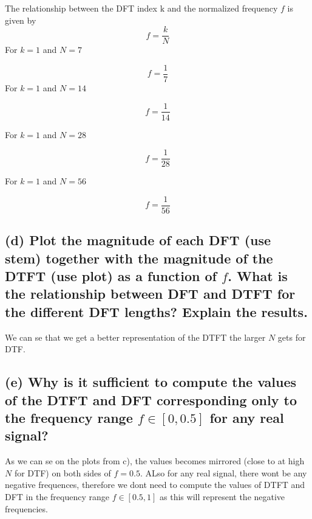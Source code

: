 The relationship between the DFT index $\mathrm{k}$ and the normalized frequency $f$ is given by
$$f=\frac{k}{N}$$
For $k=1$ and $N=7$

$$f=\frac{1}{7}$$
For $k=1$ and $N=14$

$$f=\frac{1}{14}$$

For $k=1$ and $N=28$

$$f=\frac{1}{28}$$

For $k=1$ and $N=56$

$$f=\frac{1}{56}$$


\subsection*{(d) Plot the magnitude of each DFT (use stem) together with the magnitude of the DTFT (use plot) as a function of $f$. What is the relationship between DFT and DTFT for the different DFT lengths? Explain the results.}


We can se that we get a better representation of the DTFT the larger $N$ gets for DTF.

\subsection*{(e) Why is it sufficient to compute the values of the DTFT and DFT corresponding only to the frequency range $f \in [0, 0.5]$ for any real signal?}

As we can se on the plots from c), the values becomes mirrored (close to at high $N$ for DTF) on both sides of $f=0.5$. ALso for any real signal, there wont be any negative frequences, therefore we dont need to compute the values of DTFT and DFT in the frequency range $f \in [0.5, 1]$ as this will represent the negative frequencies.